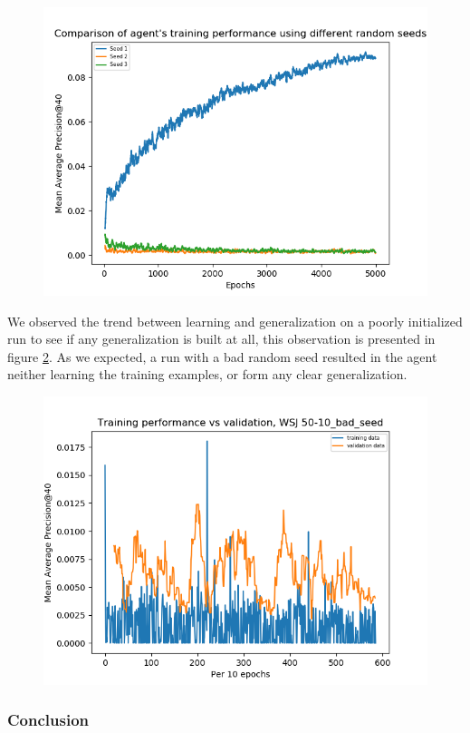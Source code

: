 \begin{figure}[H]
	\centering
	\includegraphics[width=0.7\linewidth]{images/chapter_4/second_system/seed_comparision}
	\caption{}
	\label{fig:seedcomparision}
\end{figure}


We observed the trend between learning and generalization on a poorly initialized run to see if any generalization is built at all, this observation is presented in figure \ref{fig:trainvsvalid50-10badseed}. As we expected, a run with a bad random seed resulted in the agent neither learning the training examples, or form any clear generalization. 


 \begin{figure}[H]
 	\centering
 	\includegraphics[width=0.7\linewidth]{images/chapter_4/second_system/train_vs_valid_50-10_bad_seed}
 	\caption{}
 	\label{fig:trainvsvalid50-10badseed}
 \end{figure}



\subsubsection{Conclusion}


